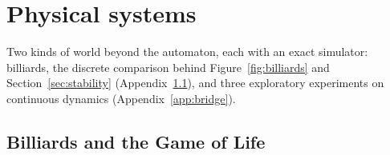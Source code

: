 \documentclass[11pt]{article}
\begin{document}
\begin{table}[h]
\centering
\caption{\textbf{Confidence-ordered commitment.} L3 SeqAcc; ``Causal'' is the share of worlds whose chosen order is exactly $1{\to}8$. Per-frame-level rows: the two denoisers of Table~\ref{tab:samplerswap}; matched-training rows: the structured diffusion model at seeds 42/43/44.}
\label{tab:e12order}
\small
{}
\end{table}

\section{Physical systems}

Two kinds of world beyond the automaton, each with an exact simulator: billiards, the discrete comparison behind Figure~\ref{fig:billiards} and Section~\ref{sec:stability} (Appendix~\ref{app:billiards}), and three exploratory experiments on continuous dynamics (Appendix~\ref{app:bridge}).

\subsection{Billiards and the Game of Life}
\label{app:billiards}
\end{document}
